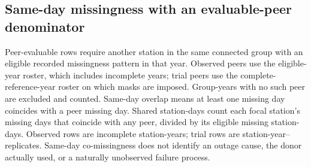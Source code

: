 \subsection{Same-day missingness with an evaluable-peer denominator}

Peer-evaluable rows require another station in the same connected group with an eligible recorded missingness pattern in that year. Observed peers use the eligible-year roster, which includes incomplete years; trial peers use the complete-reference-year roster on which masks are imposed. Group-years with no such peer are excluded and counted. Same-day overlap means at least one missing day coincides with a peer missing day. Shared station-days count each focal station's missing days that coincide with any peer, divided by its eligible missing station-days. Observed rows are incomplete station-years; trial rows are station-year--replicates. Same-day co-missingness does not identify an outage cause, the donor actually used, or a naturally unobserved failure process.

\begin{table}[t]\centering\small

\caption{Same-day overlap denominators. Any overlap is the percent of peer-evaluable incomplete rows with at least one shared missing day. Day share uses eligible missing station-days. Repeated trial masks retain their original weights; the historical observed row supplements the primary 2010--2025 comparison.}

\label{tab:gap-daily-overlap}


\end{table}

